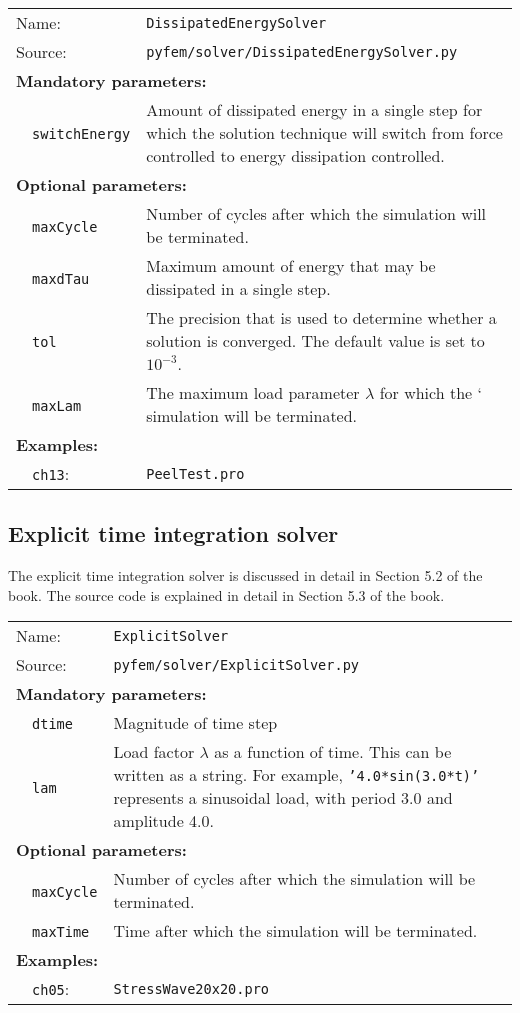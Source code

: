 \documentclass{article}
\begin{document}
\vspace{2mm}
\begin{tabular}{p{22mm}p{74mm}}
Name:         & \texttt{DissipatedEnergySolver} \\
Source:  & \texttt{pyfem/solver/DissipatedEnergySolver.py} \\
\multicolumn{2}{l}{\textbf{Mandatory parameters:}} \\
~~\texttt{switchEnergy} & Amount of dissipated energy in a single step for which the solution technique will switch from
                          force controlled to energy dissipation controlled.\\
\multicolumn{2}{l}{\textbf{Optional parameters:}} \\ 
~~\texttt{maxCycle} &  Number of cycles after which the simulation will be terminated.\\
~~\texttt{maxdTau}  &  Maximum amount of energy that may be dissipated in a single step.\\
~~\texttt{tol}      &  The precision that is used to determine whether a solution is converged. The 
                       default value is set to $10^{-3}$.\\
~~\texttt{maxLam}    & The maximum load parameter $\lambda$ for which the
                      ` simulation will be terminated.\\
\multicolumn{2}{l}{\textbf{Examples:}}\\
~~\texttt{ch13}: & \texttt{PeelTest.pro}
\end{tabular}

\subsection{Explicit time integration solver}

The explicit time integration solver is discussed in detail in Section 5.2 of the book. The source code is explained in detail in Section 5.3 of the book.

\vspace{2mm}
\begin{tabular}{p{22mm}p{74mm}}
Name:         & \texttt{ExplicitSolver} \\
Source:  & \texttt{pyfem/solver/ExplicitSolver.py} \\
\multicolumn{2}{l}{\textbf{Mandatory parameters:}} \\
~~\texttt{dtime} & Magnitude of time step\\
~~\texttt{lam}   & Load factor $\lambda$ as a function of time. This can be written
                 as a string. For example, \texttt{'4.0*sin(3.0*t)'} represents a sinusoidal 
                 load, with period 3.0 and amplitude 4.0.	\\
\multicolumn{2}{l}{\textbf{Optional parameters:}} \\ 
~~\texttt{maxCycle} &  Number of cycles after which the simulation will be terminated.\\
~~\texttt{maxTime}  &  Time after which the simulation will be terminated.\\
\multicolumn{2}{l}{\textbf{Examples:}}\\
~~\texttt{ch05}: & \texttt{StressWave20x20.pro}
\end{tabular}
\end{document}
